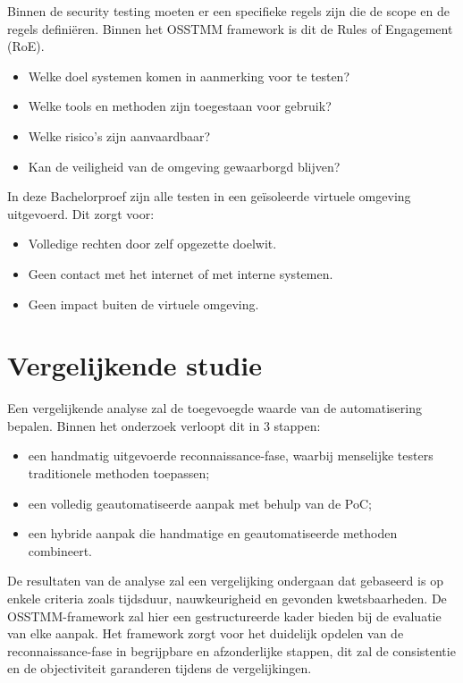 Binnen de security testing moeten er een specifieke regels zijn die de scope en de regels definiëren. Binnen het OSSTMM framework is dit de Rules of Engagement (RoE).

\begin{itemize}
  \item Welke doel systemen komen in aanmerking voor te testen?
  \item Welke tools en methoden zijn toegestaan voor gebruik?
  \item Welke risico's zijn aanvaardbaar? 
  \item Kan de veiligheid van de omgeving gewaarborgd blijven?
\end{itemize}

In deze Bachelorproef zijn alle testen in een geïsoleerde virtuele omgeving uitgevoerd. Dit zorgt voor:

\begin{itemize}
  \item Volledige rechten door zelf opgezette doelwit.
  \item Geen contact met het internet of met interne systemen.
  \item Geen impact buiten de virtuele omgeving.
\end{itemize}



\section{Vergelijkende studie}

Een vergelijkende analyse zal de toegevoegde waarde van de automatisering bepalen. Binnen het onderzoek verloopt dit in 3 stappen:

\begin{itemize}
    \item een handmatig uitgevoerde reconnaissance-fase, waarbij menselijke testers traditionele methoden toepassen;
    \item een volledig geautomatiseerde aanpak met behulp van de PoC;
    \item een hybride aanpak die handmatige en geautomatiseerde methoden combineert.
\end{itemize}

De resultaten van de analyse zal een vergelijking ondergaan dat gebaseerd is op enkele criteria zoals tijdsduur, nauwkeurigheid en gevonden kwetsbaarheden.
De OSSTMM-framework zal hier een gestructureerde kader bieden bij de evaluatie van elke aanpak. Het framework zorgt voor het duidelijk opdelen van de reconnaissance-fase in begrijpbare en afzonderlijke stappen, dit zal de consistentie en de objectiviteit garanderen tijdens de vergelijkingen.





